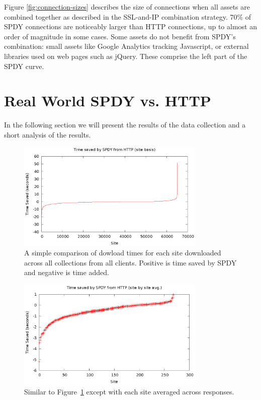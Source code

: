 \documentclass[10pt,letterpaper,notitlepage]{article}
\begin{document}
Figure \ref{fig:connection-sizes} describes the size of connections when all
assets are combined together as described in the SSL-and-IP combination
strategy. 70\% of SPDY connections are noticeably larger than HTTP connections,
up to almost an order of magnitude in some cases. Some assets do not benefit
from SPDY's combination: small assets like Google Analytics tracking
Javascript, or external libraries used on web pages such as jQuery. These
comprise the left part of the SPDY curve.


\section{Real World SPDY vs. HTTP}
\label{sec:realworld}
In the following section we will present the results of the data collection and
a short analysis of the results.

\begin{figure}[H]
\centering
\includegraphics[width=0.8\textwidth]{plots/plot1.eps}
\caption{A simple comparison of dowload times for each site downloaded across
all collections from all clients.  Positive is time saved by SPDY and negative
is time added.}
\label{fig:plot1}
\end{figure}

\begin{figure}[H]
\centering
\includegraphics[width=0.8\textwidth]{plots/plot9.eps}
\caption{Similar to Figure~\ref{fig:plot1} except with each site averaged across
responses.}
\label{fig:plot9}
\end{figure}
\end{document}
